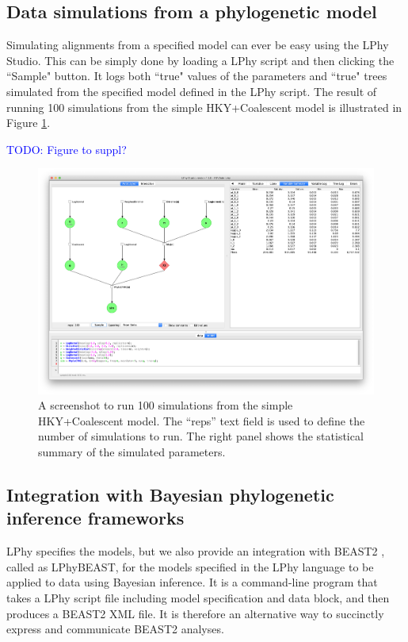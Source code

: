 \documentclass[10pt,letterpaper,table]{article}
\begin{document}
{\subsection{Data simulations from a phylogenetic model}
Simulating alignments from a specified model can ever be easy using the LPhy Studio. This can be simply done by loading a LPhy script and then clicking the ``Sample" button. 
It logs both ``true" values of the parameters and ``true" trees simulated from the specified model defined in the LPhy script. 
The result of running 100 simulations from the simple HKY+Coalescent model is illustrated in Figure \ref{fig:simulations100}. 

\textcolor{blue}{TODO: Figure to suppl?}

\begin{figure}
  \includegraphics[width=\textwidth]{figs/simulations100.png}
  \caption{A screenshot to run 100 simulations from the simple HKY+Coalescent model. The ``reps'' text field is used to define the number of simulations to run. The right panel shows the statistical summary of the simulated parameters.} 
  \label{fig:simulations100}
\end{figure}


\subsection{Integration with Bayesian phylogenetic inference frameworks}
\label{sec:lphybeast}
LPhy specifies the models, but we also provide an integration with BEAST2 \cite{bouckaert2014beastanalysis,bouckaert2019beastanalysis}, called as LPhyBEAST, for the models specified in the LPhy language to be applied to data using Bayesian inference.
It is a command-line program that takes a LPhy script file including model specification and data block, and then produces a BEAST2 XML file. 
It is therefore an alternative way to succinctly express and communicate BEAST2 analyses.

}
\end{document}
